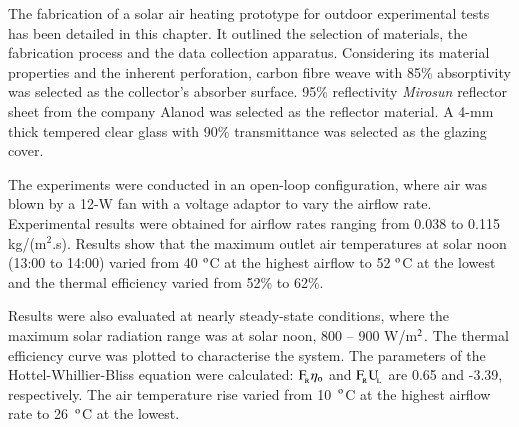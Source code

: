 The fabrication of a solar air heating prototype for outdoor experimental tests has been detailed in this chapter. It outlined the selection of materials, the fabrication process and the data collection apparatus. Considering its material properties and the inherent perforation, carbon fibre weave with 85\% absorptivity was selected as the collector's absorber surface. 95\% reflectivity \textit{Mirosun} reflector sheet from the company Alanod was selected as the reflector material. A 4-mm thick tempered clear glass with 90\% transmittance was selected as the glazing cover.

The experiments were conducted in an open-loop configuration, where air was blown by a 12-W fan with a voltage adaptor to vary the airflow rate. Experimental results were obtained for airflow rates ranging from 0.038 to 0.115 kg/(m$^2$.s). Results show that the maximum outlet air temperatures at solar noon (13:00 to 14:00) varied from 40 $^{\rm{o}}$C at the highest airflow to 52 $^{\rm{o}}$C at the lowest and the thermal efficiency varied from 52\% to 62\%. 

Results were also evaluated at nearly steady-state conditions, where the maximum solar radiation range was at solar noon, 800 -- 900 W/m$^{\rm{2}}$. The thermal efficiency curve was plotted to characterise the system. The parameters of the Hottel-Whillier-Bliss equation were calculated: $\rm{F_{\!_R}}\eta_{\rm{o}}$ and $\rm{F_{\!_R}{U_{\!_L}}}$ are 0.65 and -3.39, respectively. The air temperature rise varied from 10~$^{\rm{o}}$C at the highest airflow rate to 26~$^{\rm{o}}$C at the lowest.






